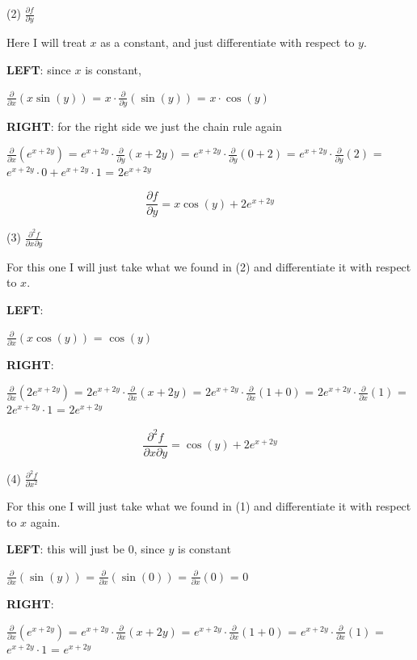 \documentclass[11pt, a4paper]{article}
\begin{document}
(2) $\frac{\partial f}{\partial y}$

Here I will treat $x$ as a constant, and just differentiate with respect to $y$.


\textbf{LEFT}: since $x$ is constant, 

$\frac{\partial}{\partial x}(x\sin(y))$ = $x \cdot \frac{\partial}{\partial y}(\sin(y))$ = $x \cdot \cos(y)$

\textbf{RIGHT}: for the right side we just the chain rule again

$\frac{\partial}{\partial x}(e^{x+2y})$ = $e^{x+2y} \cdot \frac{\partial}{\partial y}(x+2y)$ = $e^{x+2y} \cdot \frac{\partial}{\partial y}(0+2)$ = $e^{x+2y} \cdot \frac{\partial}{\partial y}(2)$ = $e^{x+2y} \cdot 0 + e^{x+2y} \cdot 1$ = $2e^{x+2y}$


\[
\frac{\partial f}{\partial y} = x \cos(y) + 2e^{x+2y}
\]


\pagebreak
(3) $\frac{\partial^2 f}{\partial x \partial y}$

For this one I will just take what we found in (2) and differentiate it with respect to $x$.

\textbf{LEFT}:

$\frac{\partial}{\partial x}(x \cos(y))$ = $\cos(y)$


\textbf{RIGHT}:

$\frac{\partial}{\partial x}(2e^{x+2y})$ = $2e^{x+2y} \cdot \frac{\partial}{\partial x}(x+2y)$ = $2e^{x+2y} \cdot \frac{\partial}{\partial x}(1+0)$ = $2e^{x+2y} \cdot \frac{\partial}{\partial x}(1)$ = $2e^{x+2y} \cdot 1$ = $2e^{x+2y}$

\[
\frac{\partial^2 f}{\partial x \partial y} = \cos(y) + 2e^{x+2y}
\]



(4) $\frac{\partial^2 f}{\partial x^2}$

For this one I will just take what we found in (1) and differentiate it with respect to $x$ again.

\textbf{LEFT}: this will just be 0, since $y$ is constant

$\frac{\partial}{\partial x}(\sin(y))$ = $\frac{\partial}{\partial x}(\sin(0))$ = $\frac{\partial}{\partial x}(0)$ = $0$

\textbf{RIGHT}:

$\frac{\partial}{\partial x}(e^{x+2y})$ = $e^{x+2y} \cdot \frac{\partial}{\partial x}(x+2y)$ = $e^{x+2y} \cdot \frac{\partial}{\partial x}(1+0)$ = $e^{x+2y} \cdot \frac{\partial}{\partial x}(1)$ = $e^{x+2y} \cdot 1$ = $e^{x+2y}$
\end{document}
